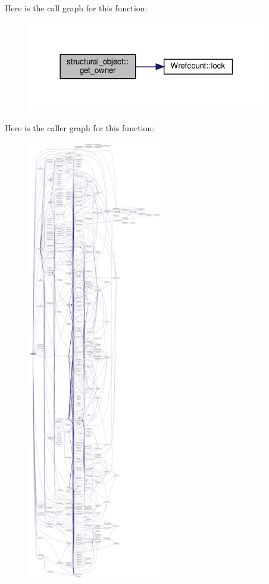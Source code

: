 Here is the call graph for this function\+:
\nopagebreak
\begin{figure}[H]
\begin{center}
\leavevmode
\includegraphics[width=297pt]{d8/da3/classstructural__object_a0a86ebdcc46ff4f74712a0d755bcad9d_cgraph}
\end{center}
\end{figure}
Here is the caller graph for this function\+:
\nopagebreak
\begin{figure}[H]
\begin{center}
\leavevmode
\includegraphics[height=550pt]{d8/da3/classstructural__object_a0a86ebdcc46ff4f74712a0d755bcad9d_icgraph}
\end{center}
\end{figure}
\mbox{\label{classstructural__object_a08b6790c882b985060c53e32d695799b}} 
